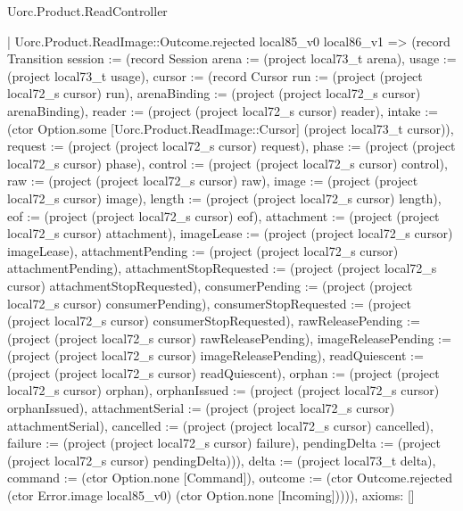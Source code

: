 \begin{lexlean}{Uorc.Product.ReadController}
\begin{semanticmodule}
{    | Uorc.Product.ReadImage::Outcome.rejected local85_v0 local86_v1 => (record Transition {session := (record Session {arena := (project local73_t arena), usage := (project local73_t usage), cursor := (record Cursor {run := (project (project local72_s cursor) run), arenaBinding := (project (project local72_s cursor) arenaBinding), reader := (project (project local72_s cursor) reader), intake := (ctor Option.some [Uorc.Product.ReadImage::Cursor] (project local73_t cursor)), request := (project (project local72_s cursor) request), phase := (project (project local72_s cursor) phase), control := (project (project local72_s cursor) control), raw := (project (project local72_s cursor) raw), image := (project (project local72_s cursor) image), length := (project (project local72_s cursor) length), eof := (project (project local72_s cursor) eof), attachment := (project (project local72_s cursor) attachment), imageLease := (project (project local72_s cursor) imageLease), attachmentPending := (project (project local72_s cursor) attachmentPending), attachmentStopRequested := (project (project local72_s cursor) attachmentStopRequested), consumerPending := (project (project local72_s cursor) consumerPending), consumerStopRequested := (project (project local72_s cursor) consumerStopRequested), rawReleasePending := (project (project local72_s cursor) rawReleasePending), imageReleasePending := (project (project local72_s cursor) imageReleasePending), readQuiescent := (project (project local72_s cursor) readQuiescent), orphan := (project (project local72_s cursor) orphan), orphanIssued := (project (project local72_s cursor) orphanIssued), attachmentSerial := (project (project local72_s cursor) attachmentSerial), cancelled := (project (project local72_s cursor) cancelled), failure := (project (project local72_s cursor) failure), pendingDelta := (project (project local72_s cursor) pendingDelta)})}), delta := (project local73_t delta), command := (ctor Option.none [Command]), outcome := (ctor Outcome.rejected (ctor Error.image local85_v0) (ctor Option.none [Incoming]))})),
  axioms: []
}


\end{semanticmodule}
\end{lexlean}
